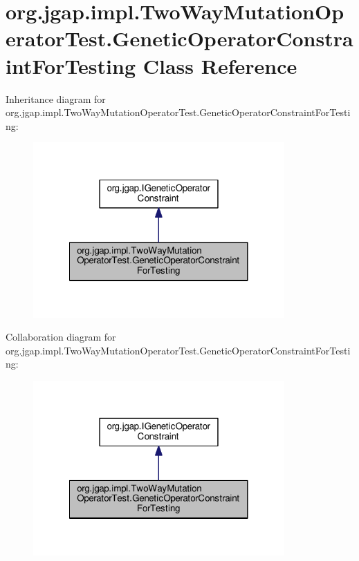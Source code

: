 \hypertarget{classorg_1_1jgap_1_1impl_1_1_two_way_mutation_operator_test_1_1_genetic_operator_constraint_for_testing}{\section{org.\-jgap.\-impl.\-Two\-Way\-Mutation\-Operator\-Test.\-Genetic\-Operator\-Constraint\-For\-Testing Class Reference}
\label{classorg_1_1jgap_1_1impl_1_1_two_way_mutation_operator_test_1_1_genetic_operator_constraint_for_testing}
}


Inheritance diagram for org.\-jgap.\-impl.\-Two\-Way\-Mutation\-Operator\-Test.\-Genetic\-Operator\-Constraint\-For\-Testing\-:
\nopagebreak
\begin{figure}[H]
\begin{center}
\leavevmode
\includegraphics[width=272pt]{classorg_1_1jgap_1_1impl_1_1_two_way_mutation_operator_test_1_1_genetic_operator_constraint_for_testing__inherit__graph}
\end{center}
\end{figure}


Collaboration diagram for org.\-jgap.\-impl.\-Two\-Way\-Mutation\-Operator\-Test.\-Genetic\-Operator\-Constraint\-For\-Testing\-:
\nopagebreak
\begin{figure}[H]
\begin{center}
\leavevmode
\includegraphics[width=272pt]{classorg_1_1jgap_1_1impl_1_1_two_way_mutation_operator_test_1_1_genetic_operator_constraint_for_testing__coll__graph}
\end{center}
\end{figure}
